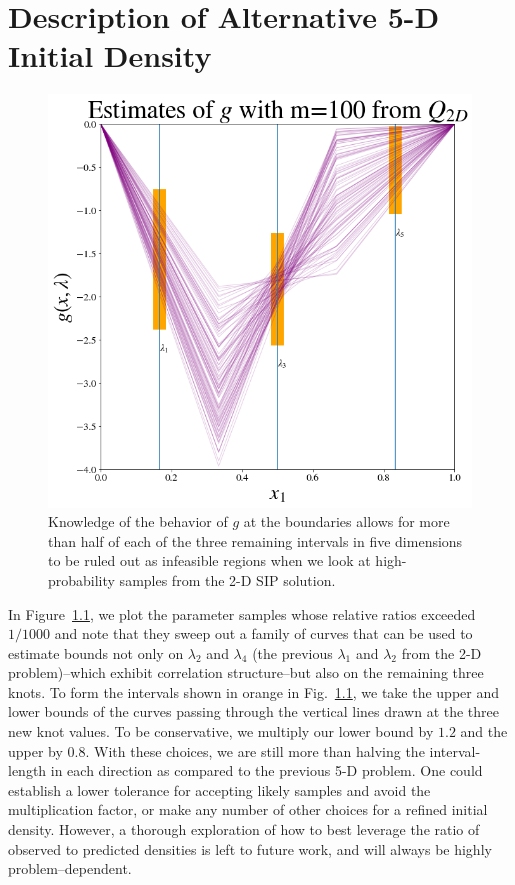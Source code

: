 \chapter{Description of Alternative 5-D Initial Density}\label{ext:pde-5d-initial}

\begin{figure}
\centering
  \includegraphics[width=0.675\linewidth]{figures/pde-highd/pde-highd-alt_initial_D5_m100.png}
\caption{
Knowledge of the behavior of $g$ at the boundaries allows for more than half of each of the three remaining intervals in five dimensions to be ruled out as infeasible regions when we look at high-probability samples from the 2-D SIP solution.
}
\label{fig:pde-highd-5d-study}
\end{figure}

In Figure~\ref{fig:pde-highd-5d-study}, we plot the parameter samples whose relative ratios exceeded $1/1000$ and note that they sweep out a family of curves that can be used to estimate bounds not only on $\lambda_2$ and $\lambda_4$ (the previous $\lambda_1$ and $\lambda_2$ from the 2-D problem)\---which exhibit correlation structure\---but also on the remaining three knots.
To form the intervals shown in orange in Fig.~\ref{fig:pde-highd-5d-study}, we take the upper and lower bounds of the curves passing through the vertical lines drawn at the three new knot values.
To be conservative, we multiply our lower bound by $1.2$ and the upper by $0.8$.
With these choices, we are still more than halving the interval-length in each direction as compared to the previous 5-D problem.
One could establish a lower tolerance for accepting likely samples and avoid the multiplication factor, or make any number of other choices for a refined initial density.
However, a thorough exploration of how to best leverage the ratio of observed to predicted densities is left to future work, and will always be highly problem--dependent.


